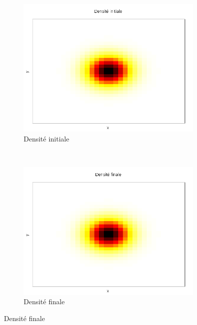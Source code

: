 \documentclass[a4paper,12pt]{article}
\begin{document}
\begin{figure}
\centering
\begin{subfigure}[b]{0.45\linewidth}
\includegraphics[width=\linewidth]{img/2DObstacle/f0.png}
\caption{Densité initiale}
\end{subfigure}
~
\begin{subfigure}[b]{0.45\linewidth}
\includegraphics[width=\linewidth]{img/2DObstacle/f1.png}
\caption{Densité finale}
\end{subfigure}


\end{figure}
\end{document}
